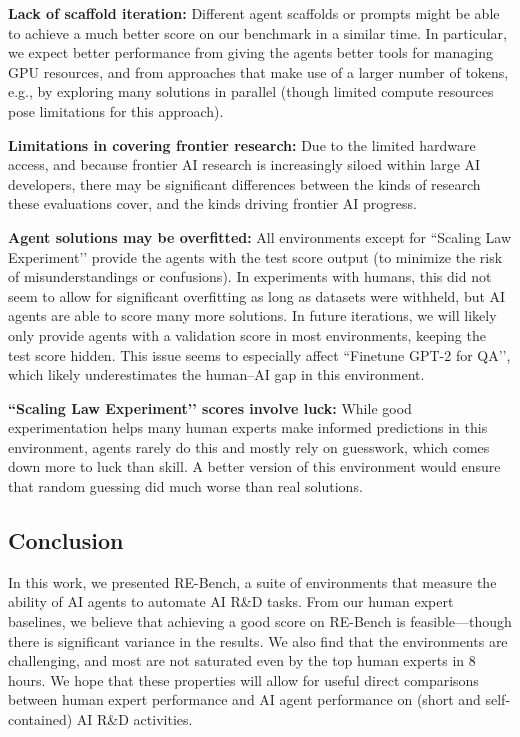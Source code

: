 \documentclass{article}
\newcommand{\EvalName}{RE-Bench}
\begin{document}
\textbf{Lack of scaffold iteration:} Different agent scaffolds or prompts might be able to achieve a much better score on our benchmark in a similar time. In particular, we expect better performance from giving the agents better tools for managing GPU resources, and from approaches that make use of a larger number of tokens, e.g., by exploring many solutions in parallel (though limited compute resources pose limitations for this approach).

\textbf{Limitations in covering frontier research:} Due to the limited hardware access, and because frontier AI research is increasingly siloed within large AI developers, there may be significant differences between the kinds of research these evaluations cover, and the kinds driving frontier AI progress. 

\textbf{Agent solutions may be overfitted:} All environments except for ``Scaling Law Experiment’’ provide the agents with the test score output (to minimize the risk of misunderstandings or confusions). In experiments with humans, this did not seem to allow for significant overfitting as long as datasets were withheld, but AI agents are able to score many more solutions. In future iterations, we will likely only provide agents with a validation score in most environments, keeping the test score hidden. This issue seems to especially affect ``Finetune GPT-2 for QA’’, which likely underestimates the human--AI gap in this environment.

\textbf{``Scaling Law Experiment’’ scores involve luck:} While good experimentation helps many human experts make informed predictions in this environment, agents rarely do this and mostly rely on guesswork, which comes down more to luck than skill. A better version of this environment would ensure that random guessing did much worse than real solutions. 

\subsection{Conclusion}
\label{sec:conclusion}

In this work, we presented \EvalName{}, a suite of environments that measure the ability of AI agents to automate AI R\&D tasks. From our human expert baselines, we believe that achieving a good score on \EvalName{} is feasible---though there is significant variance in the results. We also find that the environments are challenging, and most are not saturated even by the top human experts in 8 hours. We hope that these properties will allow for useful direct comparisons between human expert performance and AI agent performance on (short and self-contained) AI R\&D activities. 
\end{document}
